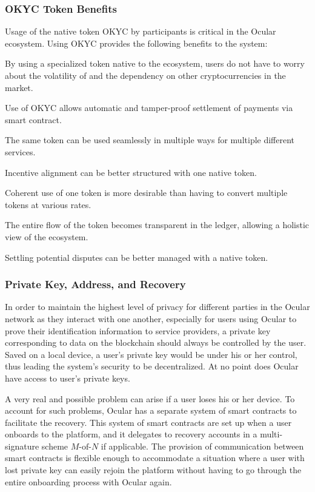 \documentclass[12pt]{article}
\let\tempone\itemize
\let\temptwo\enditemize
\renewenvironment{itemize}{\tempone\addtolength{\itemsep}{-5pt}}{\temptwo}
\begin{document}
\subsubsection*{OKYC Token Benefits}
Usage of the native token OKYC by participants is critical in the Ocular ecosystem. Using OKYC provides the following benefits to the system:
\begin{itemize}
\item By using a specialized token native to the ecosystem, users do not have to worry about the volatility of and the dependency on other cryptocurrencies in the market.
\item Use of OKYC allows automatic and tamper-proof settlement of payments via smart contract.
\item The same token can be used seamlessly in multiple ways for multiple different services.
\item Incentive alignment can be better structured with one native token.
\item Coherent use of one token is more desirable than having to convert multiple tokens at various rates.
\item The entire flow of the token becomes transparent in the ledger, allowing a holistic view of the ecosystem.
\item Settling potential disputes can be better managed with a native token.
\end{itemize}

\subsubsection*{Private Key, Address, and Recovery}
In order to maintain the highest level of privacy for different parties in the Ocular network as they interact with one another, especially for users using Ocular to prove their identification information to service providers, a private key corresponding to data on the blockchain should always be controlled by the user. Saved on a local device, a user's private key would be under his or her control, thus leading the system's security to be decentralized. At no point does Ocular have access to user's private keys. 

A very real and possible problem can arise if a user loses his or her device. To account for such problems, Ocular has a separate system of smart contracts to facilitate the recovery. This system of smart contracts are set up when a user onboards to the platform, and it delegates to recovery accounts in a multi-signature scheme $M\text{-of-}N$ if applicable. The provision of communication between smart contracts is flexible enough to accommodate a situation where a user with lost private key can easily rejoin the platform without having to go through the entire onboarding process with Ocular again.
\end{document}
